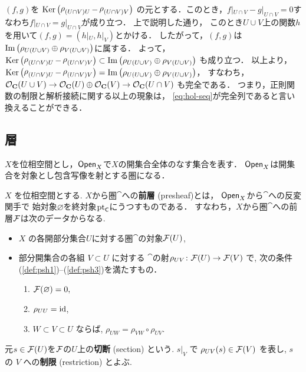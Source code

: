 $(f,g)$を
$\mathop{\mathrm{Ker}}\nolimits\left(\mathop{\rho}\nolimits_{(U\cap V)U}-\mathop{\rho}\nolimits_{(U\cap V)V}\right)$
の元とする．このとき，$f|_{U\cap V}-g|_{U\cap V}=0$すなわち$f|_{U\cap V}=g|_{U\cap V}$が成り立つ．
上で説明した通り，
このとき$U\cup V$上の関数$h$を用いて$(f,g)=(h|_U,h|_V)$とかける．
したがって，$(f,g)$は$\mathop{\mathrm{Im}}\nolimits\left(\rho_{U(U\cup V)}\oplus\rho_{V(U\cup V)}\right)$に属する．
よって，
$\mathop{\mathrm{Ker}}\nolimits\left(\mathop{\rho}\nolimits_{(U\cap V)U}-\mathop{\rho}\nolimits_{(U\cap V)V}\right)\subset\mathop{\mathrm{Im}}\nolimits\left(\rho_{U(U\cup V)}\oplus\rho_{V(U\cup V)}\right)$
も成り立つ．
以上より，
$\mathop{\mathrm{Ker}}\nolimits\left(\mathop{\rho}\nolimits_{(U\cap V)U}-\mathop{\rho}\nolimits_{(U\cap V)V}\right)=\mathop{\mathrm{Im}}\nolimits\left(\rho_{U(U\cup V)}\oplus\rho_{V(U\cup V)}\right)$，
すなわち，
$\mathcal{O}_{\mathbf{C}}(U\cup V)\to\mathcal{O}_{\mathbf{C}}(U)\oplus\mathcal{O}_{\mathbf{C}}(V)\to\mathcal{O}_{\mathbf{C}}(U\cap V)$
も完全である．
つまり，正則関数の制限と解析接続に関する以上の現象は，
\eqref{eq:hol-seq}が完全列であると言い換えることができる．

\subsection{層}
$X$を位相空間とし，$\mathop{\textsf{Open}}\nolimits_{X}$で$X$の開集合全体のなす集合を表す．
$\mathop{\textsf{Open}}\nolimits_{X}$は開集合を対象とし包含写像を射とする圏になる．

\begin{Definition}\label{def-psh}
    $X$ を位相空間とする. 
    $X$から圏$\cat$への\textbf{前層} (presheaf)とは， 
    $\mathop{\textsf{Open}}\nolimits_{X}$から$\cat$への反変関手で
    始対象$\varnothing$を終対象$\mathop{\mathrm{pt}}\nolimits_{\textsf{C}}$にうつすものである．
    すなわち，$X$から圏$\cat$への前層$\mathcal{F}$は次のデータからなる. 
    \begin{itemize}
        \item[--] $X$ の各開部分集合$U$に対する圏$\cat$の対象$\mathcal{F}(U)$,
        \item[--] 部分開集合の各組 $V \subset U$ に対する
        $\cat$の射$\rho_{UV} \colon \mathcal{F}(U)\to \mathcal{F}(V)$
        で, 次の条件(\ref{def:psh1})--(\ref{def:psh3})を満たすもの．
        \begin{enumerate}
            \renewcommand{\labelenumi}{({\arabic{enumi}})}
            \item $\mathcal{F}(\varnothing) = 0,$\label{def:psh1} 
            \item $\rho_{UU} = \mathop{\mathrm{id}}\nolimits$, \label{def:psh2}
            \item $W \subset V \subset U$ ならば, \label{def:psh3}
            $\rho_{UW} = \rho_{VW} \circ \rho_{UV}$.
        \end{enumerate}
    \end{itemize}
    元$s\in \mathcal{F}(U)$を$\mathcal{F}$の$U$上の\textbf{切断} (section) という. 
    $s|_V$ で $\rho_{UV}(s)\in\mathcal{F}(V)$ を表し, 
    $s$ の $V$ への\textbf{制限} (restriction) とよぶ. 
\end{Definition}

